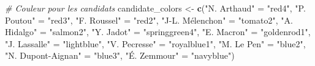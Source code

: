 \documentclass[
]{article}
\newenvironment{Shaded}{\begin{snugshade}}{\end{snugshade}}
\newcommand{\CommentTok}[1]{\textcolor[rgb]{0.56,0.35,0.01}{\textit{#1}}}
\newcommand{\FunctionTok}[1]{\textcolor[rgb]{0.13,0.29,0.53}{\textbf{#1}}}
\newcommand{\NormalTok}[1]{#1}
\newcommand{\OtherTok}[1]{\textcolor[rgb]{0.56,0.35,0.01}{#1}}
\newcommand{\StringTok}[1]{\textcolor[rgb]{0.31,0.60,0.02}{#1}}
\begin{document}
\begin{Shaded}
\begin{Highlighting}[]
\CommentTok{\# Couleur pour les candidats}
\NormalTok{candidate\_colors }\OtherTok{\textless{}{-}} \FunctionTok{c}\NormalTok{(}\StringTok{"N. Arthaud"} \OtherTok{=} \StringTok{"red4"}\NormalTok{, }
                      \StringTok{"P. Poutou"} \OtherTok{=} \StringTok{"red3"}\NormalTok{,}
                      \StringTok{"F. Roussel"} \OtherTok{=} \StringTok{"red2"}\NormalTok{,}
                      \StringTok{"J{-}L. Mélenchon"} \OtherTok{=} \StringTok{"tomato2"}\NormalTok{,}
                      \StringTok{"A. Hidalgo"} \OtherTok{=} \StringTok{"salmon2"}\NormalTok{,}
                      \StringTok{"Y. Jadot"} \OtherTok{=} \StringTok{"springgreen4"}\NormalTok{,}
                      \StringTok{"E. Macron"} \OtherTok{=} \StringTok{"goldenrod1"}\NormalTok{, }
                      \StringTok{"J. Lassalle"} \OtherTok{=} \StringTok{"lightblue"}\NormalTok{,}
                      \StringTok{"V. Pecresse"} \OtherTok{=} \StringTok{"royalblue1"}\NormalTok{,}
                      \StringTok{"M. Le Pen"} \OtherTok{=} \StringTok{"blue2"}\NormalTok{,}
                      \StringTok{"N. Dupont{-}Aignan"} \OtherTok{=} \StringTok{"blue3"}\NormalTok{,}
                      \StringTok{"É. Zemmour"} \OtherTok{=} \StringTok{"navyblue"}\NormalTok{)}


\end{Highlighting}
\end{Shaded}
\end{document}
